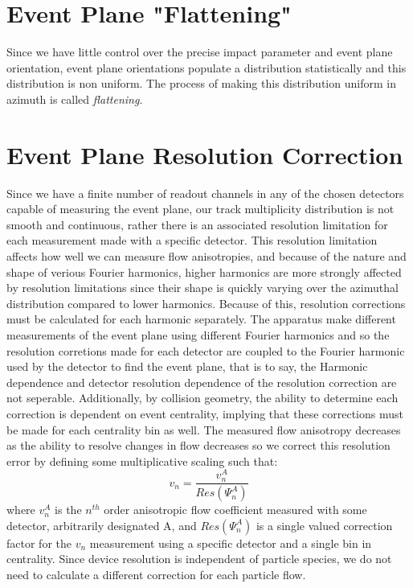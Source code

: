\section{Event Plane "Flattening"}
Since we have little control over the precise impact parameter and event plane orientation, event plane orientations populate a distribution statistically and this distribution is non uniform. The process of making this distribution uniform in azimuth is called \textit{flattening}.


\section{Event Plane Resolution Correction}
Since we have a finite number of readout channels in any of the chosen detectors capable of measuring the event plane, our track multiplicity distribution is not smooth and continuous, rather there is an associated resolution limitation for each measurement made with a specific detector. This resolution limitation affects how well we can measure flow anisotropies, and because of the nature and shape of verious Fourier harmonics, higher harmonics are more strongly affected by resolution limitations since their shape is quickly varying over the azimuthal distribution compared to lower harmonics. Because of this, resolution corrections must be calculated for each harmonic separately. The apparatus make different measurements of the event plane using different Fourier harmonics and so the resolution corretions made for each detector are coupled to the Fourier harmonic used by the detector to find the event plane, that is to say, the Harmonic dependence and detector resolution dependence of the resolution correction are not seperable. Additionally, by collision geometry, the ability to determine each correction is dependent on event centrality, implying that these corrections must be made for each centrality bin as well. The measured flow anisotropy decreases as the ability to resolve changes in flow decreases so we correct this resolution error by defining some multiplicative scaling such that:
\begin{equation}
v_n = \frac{v_n^{A}}{Res(\Psi_n^A)}
\end{equation}
where $v_n^{A}$ is the $n^{th}$ order anisotropic flow coefficient measured with some detector, arbitrarily designated A, and $Res(\Psi_n^A)$ is a single valued correction factor for the $v_n$ measurement using a specific detector and a single bin in centrality. Since device resolution is independent of particle species, we do not need to calculate a different correction for each particle flow. 


